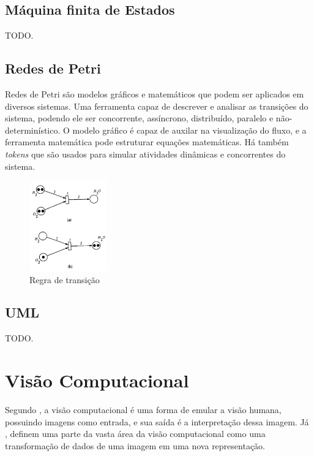 \subsection{Máquina finita de Estados}
TODO.


\subsection{Redes de Petri}
Redes de Petri são modelos gráficos e matemáticos que podem ser aplicados em diversos sistemas. Uma ferramenta capaz de descrever e analisar as transições do sistema, podendo ele ser concorrente, assíncrono, distribuído, paralelo e não-determinístico. O modelo gráfico é capaz de auxilar na visualização do fluxo, e a ferramenta matemática pode estruturar equações matemáticas. Há também \textit{tokens} que são usados para simular atividades dinâmicas e concorrentes do sistema. \cite{murata:1989}
 
 \begin{figure}[H]
	\centering
    	\caption{\label{fig:petri}Regra de transição}
		\includegraphics[width = 0.3\textwidth]	{resources/petri}
\end{figure}

\subsection{UML}
TODO.


\section{Visão Computacional}
Segundo , a visão computacional é uma forma de emular a visão humana, possuindo imagens como entrada, e sua saída é a interpretação dessa imagem.
Já , definem uma parte da vasta área da visão computacional como uma transformação de dados de uma imagem em uma nova representação.

